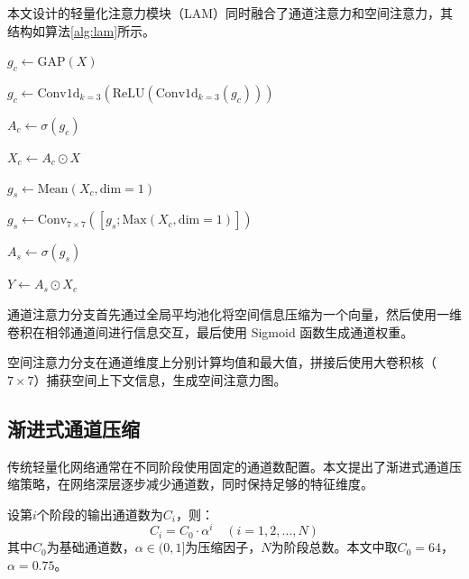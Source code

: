 \documentclass{harryopo-paper}
\begin{document}
本文设计的轻量化注意力模块（LAM）同时融合了通道注意力和空间注意力，其结构如算法\ref{alg:lam}所示。

\begin{algorithm}[htbp]
\caption{轻量化注意力模块前向传播}
\label{alg:lam}

$g_c \leftarrow \text{GAP}(X)$ 

$g_c \leftarrow \text{Conv1d}_{k=3}(\text{ReLU}(\text{Conv1d}_{k=3}(g_c)))$ 

$A_c \leftarrow \sigma(g_c)$ 

$X_c \leftarrow A_c \odot X$ 

$g_s \leftarrow \text{Mean}(X_c, \text{dim}=1)$ 

$g_s \leftarrow \text{Conv}_{7\times7}([g_s; \text{Max}(X_c, \text{dim}=1)])$ 

$A_s \leftarrow \sigma(g_s)$ 

$Y \leftarrow A_s \odot X_c$ 

\end{algorithm}

通道注意力分支首先通过全局平均池化将空间信息压缩为一个向量，然后使用一维卷积在相邻通道间进行信息交互，最后使用 Sigmoid 函数生成通道权重。

空间注意力分支在通道维度上分别计算均值和最大值，拼接后使用大卷积核（$7\times7$）捕获空间上下文信息，生成空间注意力图。

\subsection{渐进式通道压缩}

传统轻量化网络通常在不同阶段使用固定的通道数配置。本文提出了渐进式通道压缩策略，在网络深层逐步减少通道数，同时保持足够的特征维度。

设第$i$个阶段的输出通道数为$C_i$，则：
\begin{equation}
C_i = C_0 \cdot \alpha^{i} \quad (i = 1, 2, \dots, N)
\label{eq:channel}
\end{equation}
其中$C_0$为基础通道数，$\alpha \in (0, 1]$为压缩因子，$N$为阶段总数。本文中取$C_0=64$，$\alpha=0.75$。
\end{document}
